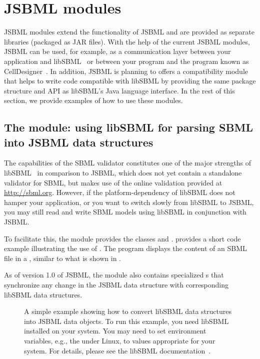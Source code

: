 
\section{JSBML modules}
\label{sec:jsbml-modules-details}

JSBML modules extend the functionality of JSBML and are provided as
separate libraries (packaged as JAR files). With the help of the current
JSBML modules, JSBML can be used, for example, as a communication layer
 between your application and
libSBML~\citep{Bornstein2008} or between your program and the program known
as CellDesigner~\citep{Funahashi2003}. In addition, JSBML is planning to offers a
compatibility module %
that helps to write code compatible with libSBML by providing the same package 
structure and API as libSBML's Java
language interface. In the rest of this section, we provide examples of how
to use these modules.


\subsection{The  module: using libSBML for parsing
  SBML into JSBML data structures}

The capabilities of the SBML validator constitutes one
of the major strengths of libSBML~\citep{Bornstein2008} in comparison to
JSBML, which does not yet contain a standalone validator for SBML, but makes
use of the online validation provided at \url{http://sbml.org}. However, if
the platform-dependency of libSBML does not hamper your application, or you
want to switch slowly from libSBML to JSBML, you may still read and write
SBML models using libSBML in conjunction with JSBML.

To facilitate this, the module  provides the classes
\LibSBMLReader and \LibSBMLWriter.   provides a short
code example illustrating the use of \LibSBMLReader.  The program displays the
content of an SBML file in a \JTree, similar to what is shown in
.

As of version 1.0 of JSBML, the  module also contains
specialized \TreeNodeChangeListener{}s that synchronize any change in the
JSBML data structure with corresponding libSBML data structures.

\begin{figure}[htb]
  \caption{A simple example showing how to convert libSBML data structures
    into JSBML data objects.  To run this example, you need libSBML
    installed on your system.  You may need to set environment variables,
    e.g., the 
    under Linux, to values appropriate for your
    system. For details, please see the libSBML
    documentation~\cite{libSBMLwebsite}.}
  \label{lst:LibSBMLio}
\end{figure}


